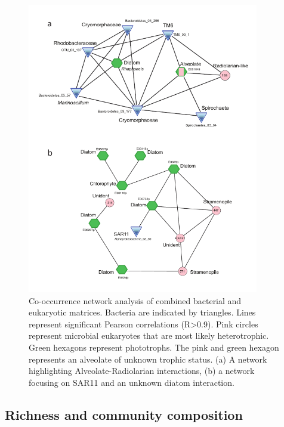 %
\begin{figure}[htbp] \centering 
	\includegraphics[width=0.9\textwidth]{Chapter_2_MIRADA/Figures/Figure_5_PAL_Ev9Bv6_pooled_50_plusminus90_corr_networkMOD2} 
	\caption[Co-occurrence analysis of combined bacterial and eukaryotic matrices.]{Co-occurrence network analysis of combined bacterial and eukaryotic matrices. Bacteria are indicated by triangles. Lines represent significant Pearson correlations (R>0.9). Pink circles represent microbial eukaryotes that are most likely heterotrophic. Green hexagons represent phototrophs. The pink and green hexagon represents an alveolate of unknown trophic status. (a) A network highlighting Alveolate-Radiolarian interactions, (b) a network focusing on SAR11 and an unknown diatom interaction.} 
	\label{fig:cooccur1} 
\end{figure}

\subsection{Richness and community composition}\label{ssc:richness-and-community-composition}

